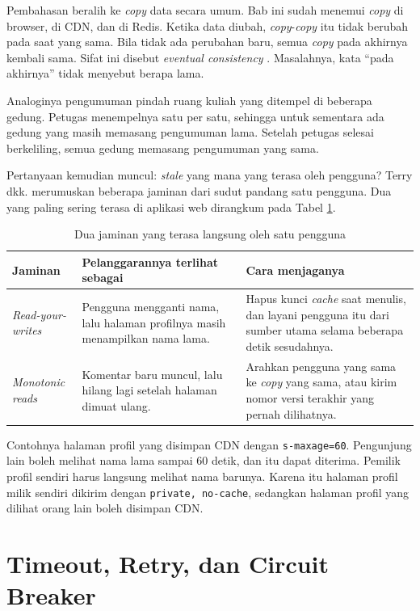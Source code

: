Pembahasan beralih ke \textit{copy} data secara umum. Bab ini sudah menemui \textit{copy}
di browser, di CDN, dan di Redis. Ketika data diubah, \textit{copy}-\textit{copy} itu tidak
berubah pada saat yang sama. Bila tidak ada perubahan baru, semua \textit{copy} pada
akhirnya kembali sama. Sifat ini disebut \textit{eventual consistency}
\cite{vogels2009eventually}. Masalahnya, kata ``pada akhirnya'' tidak menyebut
berapa lama.

Analoginya pengumuman pindah ruang kuliah yang ditempel di beberapa gedung.
Petugas menempelnya satu per satu, sehingga untuk sementara ada gedung yang
masih memasang pengumuman lama. Setelah petugas selesai berkeliling, semua
gedung memasang pengumuman yang sama.

Pertanyaan kemudian muncul: \textit{stale} yang mana yang terasa oleh pengguna? Terry
dkk. \cite{terry1994session} merumuskan beberapa jaminan dari sudut pandang
satu pengguna. Dua yang paling sering terasa di aplikasi web dirangkum pada
Tabel \ref{tab:jaminan-sesi}.

\begin{table}[!htb]
  \centering
  \caption{Dua jaminan yang terasa langsung oleh satu pengguna}
  \label{tab:jaminan-sesi}
  \begin{tabularx}{\textwidth}{lXX}
    \hline
    \textbf{Jaminan} & \textbf{Pelanggarannya terlihat sebagai} & \textbf{Cara menjaganya} \\
    \hline
    \textit{Read-your-writes} & Pengguna mengganti nama, lalu halaman profilnya masih menampilkan nama lama. & Hapus kunci \textit{cache} saat menulis, dan layani pengguna itu dari sumber utama selama beberapa detik sesudahnya. \\
    \hline
    \textit{Monotonic reads} & Komentar baru muncul, lalu hilang lagi setelah halaman dimuat ulang. & Arahkan pengguna yang sama ke \textit{copy} yang sama, atau kirim nomor versi terakhir yang pernah dilihatnya. \\
    \hline
  \end{tabularx}
\end{table}

Contohnya halaman profil yang disimpan CDN dengan \texttt{s-maxage=60}.
Pengunjung lain boleh melihat nama lama sampai 60 detik, dan itu dapat
diterima. Pemilik profil sendiri harus langsung melihat nama barunya. Karena
itu halaman profil milik sendiri dikirim dengan \texttt{private, no-cache},
sedangkan halaman profil yang dilihat orang lain boleh disimpan CDN.

\section{Timeout, Retry, dan Circuit Breaker}
\label{sec:resilience}

